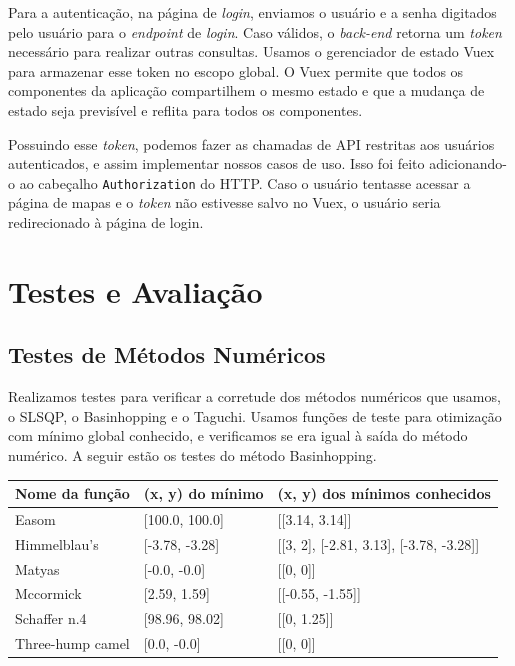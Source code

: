 \documentclass[]{politex}
\begin{document}
Para a autenticação, na página de \textit{login}, enviamos o usuário e a senha digitados
pelo usuário para o \textit{endpoint} de \textit{login}. Caso válidos, o \textit{back-end} retorna um
\textit{token} necessário para realizar outras consultas. Usamos o gerenciador de estado Vuex
para armazenar esse token no escopo global. O Vuex permite que todos os
componentes da aplicação compartilhem o mesmo estado e que a mudança de estado
seja previsível e reflita para todos os componentes.

Possuindo esse \textit{token}, podemos fazer as chamadas de API restritas aos usuários
autenticados, e assim implementar nossos casos de uso. Isso foi feito adicionando-o
ao cabeçalho \texttt{Authorization} do HTTP. Caso o usuário tentasse acessar a 
página de mapas e o \textit{token} não estivesse salvo no Vuex, o usuário seria
redirecionado à página de login.


\chapter{Testes e Avaliação}


\section{Testes de Métodos Numéricos}
Realizamos testes para verificar a corretude dos métodos numéricos que usamos, 
o SLSQP, o Basinhopping e o Taguchi. Usamos funções de teste para otimização
com mínimo global conhecido, e verificamos se era
igual à saída do método numérico. A seguir estão os testes do método Basinhopping.

\begin{table}[H]
\begin{tabular}{l|l|l}
 Nome da função & (x, y) do mínimo & (x, y) dos mínimos conhecidos \\ \hline
 \rowcolor{Gray}
 Easom & [100.0, 100.0] & [[3.14, 3.14]] \\
 Himmelblau's & [-3.78, -3.28] & [[3, 2], [-2.81, 3.13], [-3.78, -3.28]] \\
 Matyas & [-0.0, -0.0] & [[0, 0]] \\
 \rowcolor{Gray}
 Mccormick & [2.59, 1.59] & [[-0.55, -1.55]] \\
 \rowcolor{Gray}
 Schaffer n.4 & [98.96, 98.02] & [[0, 1.25]] \\
 Three-hump camel & [0.0, -0.0] & [[0, 0]]
\end{tabular}
\end{table}
\end{document}
